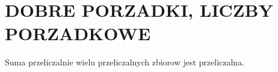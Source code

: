 \documentclass{article}
\begin{document}
\ttfamily
\section*{DOBRE PORZADKI, LICZBY PORZADKOWE}
    Suma przeliczalnie wielu przeliczalnych zbiorow jest przeliczalna.
\end{document}
